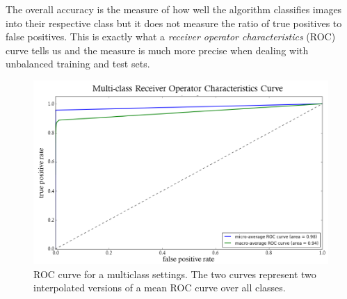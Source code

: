 \documentclass[11pt,a4paper]{article}
\begin{document}
The overall accuracy is the measure of how well the algorithm classifies images into their respective class but it does not measure the ratio of true positives to false positives. This is exactly what a \textit{receiver operator characteristics} (ROC) curve tells us and the measure is much more precise when dealing with unbalanced training and test sets.
\begin{figure}[h!]
	\includegraphics[width=\textwidth]{roc_multi.png}
	\centering
	\caption[Average ROC Curve]{ROC curve for a multiclass settings. The two curves represent two interpolated versions of a mean ROC curve over all classes.}
	\label{fig:roc_avg}
\end{figure}
\end{document}
